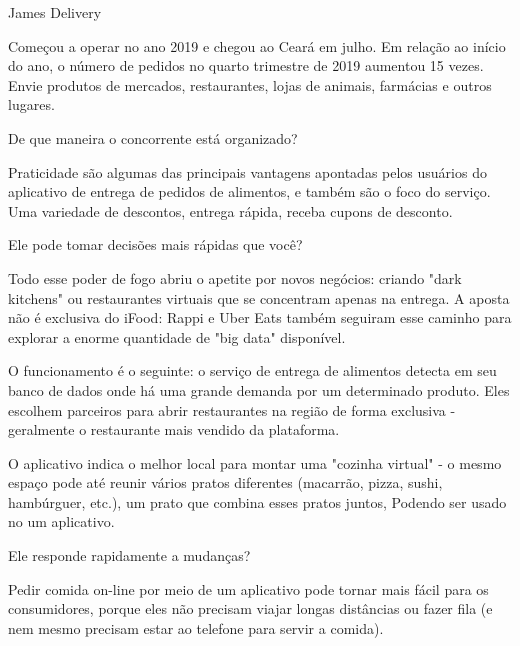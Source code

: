 James Delivery\par
Começou a operar no ano 2019 e chegou ao Ceará em julho. Em relação ao início do ano, o número de pedidos no quarto trimestre de 2019 aumentou 15 vezes. Envie produtos de mercados, restaurantes, lojas de animais, farmácias e outros lugares.\par

\begin{commentA}
De que maneira o concorrente está organizado?
\par \end{commentA}

Praticidade são algumas das principais vantagens apontadas pelos usuários do aplicativo de entrega de pedidos de alimentos, e também são o foco do serviço. Uma variedade de descontos, entrega rápida, receba cupons de desconto.\par

\begin{commentA}
Ele pode tomar decisões mais rápidas que você?
\par \end{commentA}

Todo esse poder de fogo abriu o apetite por novos negócios: criando "dark kitchens" ou restaurantes virtuais que se concentram apenas na entrega. A aposta não é exclusiva do iFood: Rappi e Uber Eats também seguiram esse caminho para explorar a enorme quantidade de "big data" disponível.

O funcionamento é o seguinte: o serviço de entrega de alimentos detecta em seu banco de dados onde há uma grande demanda por um determinado produto. Eles escolhem parceiros para abrir restaurantes na região de forma exclusiva - geralmente o restaurante mais vendido da plataforma.

O aplicativo indica o melhor local para montar uma "cozinha virtual" - o mesmo espaço pode até reunir vários pratos diferentes (macarrão, pizza, sushi, hambúrguer, etc.), um prato que combina esses pratos juntos, Podendo ser usado no um aplicativo.

\begin{commentA}
Ele responde rapidamente a mudanças?
\par \end{commentA}

Pedir comida on-line por meio de um aplicativo pode tornar mais fácil para os consumidores, porque eles não precisam viajar longas distâncias ou fazer fila (e nem mesmo precisam estar ao telefone para servir a comida).\par 

